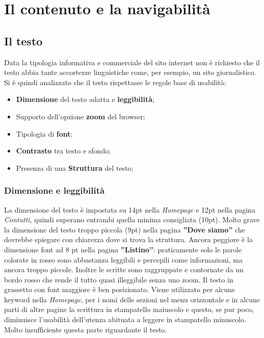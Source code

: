 \documentclass[../Relazione.tex]{subfiles}
\begin{document}
\section{Il contenuto e la navigabilità}

	\subsection{Il testo}
		Data la tipologia informativa e commerciale del sito internet non è richiesto che il testo abbia tante accortezze linguistiche come, per esempio, un sito giornalistico. Si è quindi analizzato che il testo rispettasse le regole base di usabilità:
		\begin{itemize}
			\item \textbf{Dimensione} del testo adatta e \textbf{leggibilità};
			\item Supporto dell'opzione \textbf{zoom} del browser;
			\item Tipologia di \textbf{font};
			\item \textbf{Contrasto} tra testo e sfondo;
			\item Presenza di una \textbf{Struttura} del testo;
		\end{itemize}
		
		\subsubsection{Dimensione e leggibilità}
			La dimensione del testo è impostata su 14pt nella \emph{Homepage} e 12pt nella pagina \emph{Contatti}, quindi superano entrambi quella minima consigliata (10pt). Molto grave la dimensione del testo troppo piccola (9pt) nella pagina \textbf{''Dove siamo''} che dovrebbe spiegare con chiarezza dove si trova la struttura. Ancora peggiore è la dimensione font ad 8 pt nella pagina \textbf{''Listino''}: praticamente solo le parole colorate in rosso sono abbastanza leggibili e percepili come informazioni, ma ancora troppo piccole. Inoltre le scritte sono raggruppate e contornate da un bordo rosso che rende il tutto quasi illeggibile senza uno zoom.
			Il testo in grassetto con font maggiore è ben posizionato. Viene utilizzato per alcune keyword nella \emph{Homepage}, per i nomi delle sezioni nel menu orizzontale e in alcune parti di altre pagine la scrittura in stampatello maiuscolo e questo, se pur poco, diminuisce l'usabilità dell'utenza abituata a leggere in stampatello minuscolo.
			Molto insufficiente questa parte riguardante il testo.
			
\end{document}
